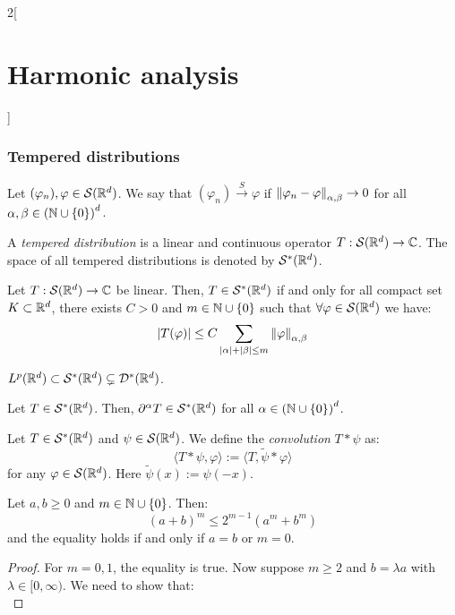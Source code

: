 \documentclass[../../../main_math.tex]{subfiles}
\begin{document}
\begin{multicols}{2}[\section{Harmonic analysis}]
  \subsubsection{Tempered distributions}
  \begin{definition}
    Let $(\varphi_n),\varphi\in\mathcal{S}(\mathbb{R}^d)$. We say that $(\varphi_n)\overset{S}{\longrightarrow}\varphi$ if $\left\|\varphi_n-\varphi\right\|_{\alpha,\beta}\to 0$ for all $\alpha,\beta\in{(\ensuremath{\mathbb{N}}\cup\{0\})}^d$.
  \end{definition}
  \begin{definition}
    A \emph{tempered distribution} is a linear and continuous operator $T:\mathcal{S}(\mathbb{R}^d)\to \mathbb{C}$. The space of all tempered distributions is denoted by $\mathcal{S}^*(\mathbb{R}^d)$.
  \end{definition}
  \begin{lemma}
    Let $T:\mathcal{S}(\mathbb{R}^d)\to \mathbb{C}$ be linear. Then, $T\in\mathcal{S}^*(\mathbb{R}^d)$ if and only for all compact set $K\subset\mathbb{R}^d$, there exists $C>0$ and $m\in\mathbb{N}\cup\{0\}$ such that $\forall \varphi\in \mathcal{S}(\mathbb{R}^d)$ we have:
    $$
      \abs{T(\varphi)}\leq C\sum_{\abs{\alpha}+\abs{\beta}\leq m}\left\|\varphi\right\|_{\alpha,\beta}
    $$
  \end{lemma}
  \begin{lemma}\label{HA:LpSD}
    $L^p(\mathbb{R}^d)\subset\mathcal{S}^*(\mathbb{R}^d)\subsetneq \mathcal{D}^*(\mathbb{R}^d)$.
  \end{lemma}
  \begin{lemma}
    Let $T\in \mathcal{S}^*(\mathbb{R}^d)$. Then, $\partial^\alpha T\in \mathcal{S}^*(\mathbb{R}^d)$ for all $\alpha\in{(\ensuremath{\mathbb{N}}\cup\{0\})}^d$.
  \end{lemma}
  \begin{definition}
    Let $T\in \mathcal{S}^*(\mathbb{R}^d)$ and $\psi\in \mathcal{S}(\mathbb{R}^d)$. We define the \emph{convolution} $T*\psi$ as:
    $$
      \langle T*\psi,\varphi\rangle:=\langle T,\tilde\psi*\varphi\rangle
    $$
    for any $\varphi\in \mathcal{S}(\mathbb{R}^d)$. Here $\tilde\psi(x):=\psi(-x)$.
  \end{definition}
  \begin{lemma}\label{HA:lemma_aMbM}
    Let $a,b\geq 0$ and $m\in\mathbb{N}\cup\{0\}$. Then:
    $$
      {(a+b)}^m\leq 2^{m-1}(a^m+b^m)
    $$
    and the equality holds if and only if $a=b$ or $m=0$.
  \end{lemma}
  \begin{proof}
    For $m=0,1$, the equality is true. Now suppose $m\geq 2$ and $b=\lambda a$ with $\lambda\in [0,\infty)$. We need to show that:
    $$
$$
\end{proof}
\end{multicols}
\end{document}
